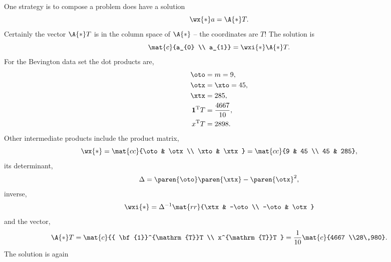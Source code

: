 One strategy is to compose a problem does have a solution
  \begin{equation*}   %
    \wx{*} a = \A{*} T.
  \end{equation*}
Certainly the vector $\A{*} T$ is in the column space of $\A{*}$ -- the coordinates are $T$! The solution is
  \begin{equation*}   %
    \mat{c}{a_{0} \\ a_{1}} = \wxi{*} \A{*}T.
  \end{equation*}
For the Bevington data set the dot products are,
  \begin{equation*}   %
  \begin{split}
    \oto &= m = 9, \\
    \otx &= \xto = 45, \\
    \xtx &= 285, \\
    {\bf{1}}^{\mathrm{T}}T &= \frac{4667}{10}, \\
    x^{\mathrm{T}}T        &= 2898.
  \end{split}
  \end{equation*}
Other intermediate products include the product matrix,
  \begin{equation*}   %
     \wx{*} = \mat{cc}{\oto & \otx \\ \xto & \xtx} = \mat{cc}{9 & 45 \\ 45 & 285},
  \end{equation*}
its determinant,
  \begin{equation}   %
    \Delta = \paren{\oto} \paren{\xtx} - \paren{\otx}^{2},
    \label{eq:det again}
  \end{equation}
inverse,
  \begin{equation*}   %
    \wxi{*} = \Delta^{-1} 
      \mat{rr}{\xtx & -\oto \\ -\oto & \otx}
  \end{equation*}
and the vector,
  \begin{equation*}   %
    \A{*}T = 
      \mat{c}{{ \bf{1}}^{\mathrm{T}}T \\ x^{\mathrm{T}}T } =
      \frac{1}{10} \mat{c}{4667 \\28\,980}.
  \end{equation*}
The solution is again
